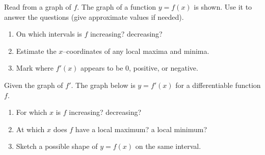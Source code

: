 \documentclass[11pt]{article}
\def\textbf#1{#1}%
\newcounter{question}
\begin{document}
\begin{question}
\textbf{Read from a graph of $f$.}
The graph of a function $y=f(x)$ is shown. Use it to answer the questions (give approximate values if needed).
\begin{enumerate}
  \item On which intervals is $f$ increasing? decreasing?
  \item Estimate the $x$–coordinates of any local maxima and minima.
  \item Mark where $f'(x)$ appears to be $0$, positive, or negative.
\end{enumerate}

\begin{center}
\end{center}
\end{question}

\begin{question}
\textbf{Given the graph of $f'$.}
The graph below is $y=f'(x)$ for a differentiable function $f$.
\begin{enumerate}
  \item For which $x$ is $f$ increasing? decreasing?
  \item At which $x$ does $f$ have a local maximum? a local minimum?
  \item Sketch a possible shape of $y=f(x)$ on the same interval.
\end{enumerate}

\begin{center}
\end{center}
\end{question}
\end{document}
